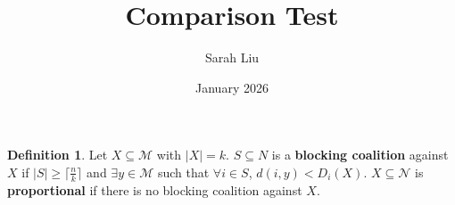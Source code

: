 \documentclass{article}
\title{Comparison Test}
\author{Sarah Liu}
\date{January 2026}
\theoremstyle{definition}
\newtheorem{definition}[theorem]{Definition}
\theoremstyle{remark}
\begin{document}
\maketitle
\begin{definition}
    Let $X\subseteq \mathcal{M}$ with $|X|=k$.
    $S\subseteq N$ is a \textbf{blocking coalition} against $X$ if $|S|\geq\lceil \frac{n}{k}\rceil$ and $\exists y\in\mathcal{M}$ such that $\forall i\in S$, $d(i,y)<D_i(X)$.
    $X\subseteq \mathcal{N}$ is \textbf{proportional} if there is no blocking coalition against $X$.
\end{definition}
\end{document}
